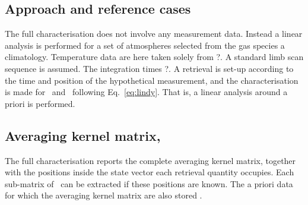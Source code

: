 \subsection{Approach and reference cases}
\label{sec:fullchar:select}
%
The full characterisation does not involve any measurement data. Instead a
linear analysis is performed for a set of atmospheres selected from the gas
species a climatology. Temperature data are here taken solely from
?. A standard limb scan sequence is assumed. The integration times
?. A retrieval is set-up according to the time and
position of the hypothetical measurement, and the characterisation is made for
\aWfnMtr{\SttVct}\ and \CtrFncMtr\ following Eq.~\ref{eq:lindy}. That is, a
linear analysis around a priori is performed.
\\


\subsection{Averaging kernel matrix, \AvrKrnMtr}
\label{sec:A}
%
The full characterisation reports the complete averaging kernel matrix,
together with the positions inside the state vector each retrieval quantity
occupies. Each sub-matrix of \AvrKrnMtr\ can be extracted if these positions
are known. The a priori data for which the averaging kernel matrix are also
stored . 
\\


